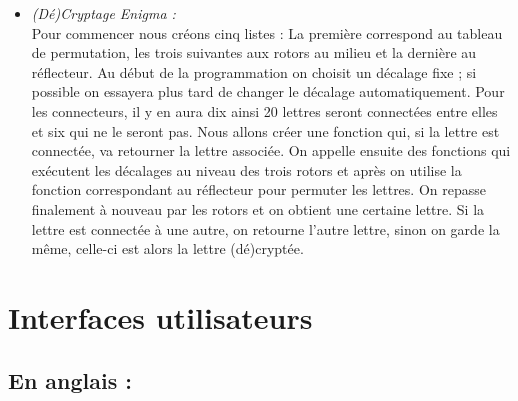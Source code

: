 \documentclass[a4paper,12pt,abstracton,titlepage]{scrartcl}
\begin{document}
\begin{itemize}
\item \textit{(Dé)Cryptage Enigma :}\\
Pour commencer nous créons cinq listes : La première correspond au tableau de permutation, les trois suivantes aux rotors au milieu et la dernière au réflecteur. Au début de la programmation on choisit un décalage fixe ; si possible on essayera plus tard de changer le décalage automatiquement.
Pour les connecteurs, il y en aura dix ainsi 20 lettres seront connectées entre elles et six qui ne le seront pas. Nous allons créer une fonction qui, si la lettre est connectée, va retourner la lettre associée.
On appelle ensuite des fonctions qui exécutent les décalages au niveau des trois rotors et après on utilise la fonction correspondant au réflecteur pour permuter les lettres. On repasse finalement à nouveau par les rotors et on obtient une certaine lettre. Si la lettre est connectée à une autre, on retourne l’autre lettre, sinon on garde la même, celle-ci est alors la lettre (dé)cryptée.\\
\end{itemize}















\newpage
\section{Interfaces utilisateurs}

{
}

\subsection{En anglais :}
\end{document}
